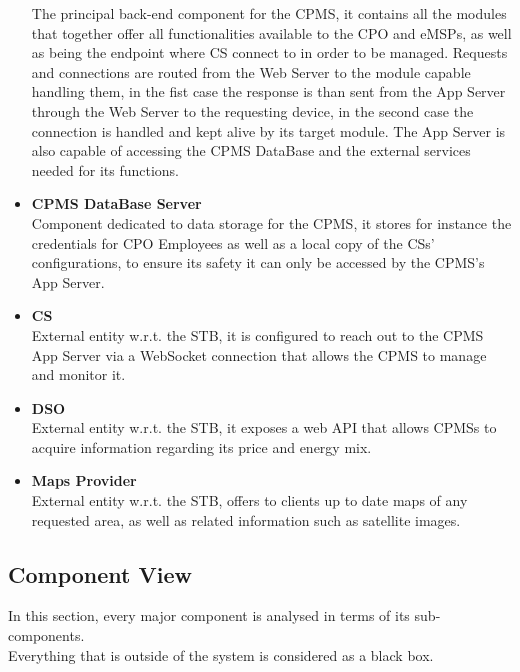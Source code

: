\documentclass[11pt]{article}
\begin{document}
\begin{itemize}
        The principal back-end component for the CPMS, it contains all the modules that together offer all functionalities available to the CPO and eMSPs, as well as being the endpoint where CS connect to in order to be managed. Requests and connections are routed from the Web Server to the module capable handling them, in the fist case the response is than sent from the App Server through the Web Server to the requesting device, in the second case the connection is handled and kept alive by its target module. The App Server is also capable of accessing the CPMS DataBase and the external services needed for its functions.
    \item \textbf{CPMS DataBase Server} \\
        Component dedicated to data storage for the CPMS, it stores for instance the credentials for CPO Employees as well as a local copy of the CSs' configurations, to ensure its safety it can only be accessed by the CPMS's App Server.
    \item \textbf{CS} \\
        External entity w.r.t. the STB, it is configured to reach out to the CPMS App Server via a WebSocket connection that allows the CPMS to manage and monitor it.
    \item \textbf{DSO} \\
        External entity w.r.t. the STB, it exposes a web API that allows CPMSs to acquire information regarding its price and energy mix.
    \item \textbf{Maps Provider} \\
        External entity w.r.t. the STB, offers to clients up to date maps of any requested area, as well as related information such as satellite images.
\end{itemize}

\subsection{Component View}

In this section, every major component is analysed in terms of its sub-components. \\
Everything that is outside of the system is considered as a black box.

\newpage
\end{document}
